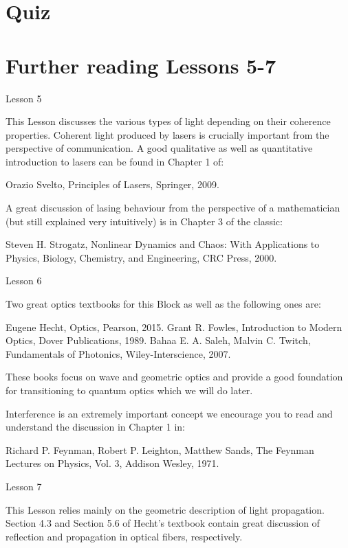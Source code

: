 \newpage
\section{Quiz}

\section{Further reading Lessons 5-7}

Lesson 5

This Lesson discusses the various types of light depending on their coherence properties. Coherent light produced by lasers is crucially important from the perspective of communication. A good qualitative as well as quantitative introduction to lasers can be found in Chapter 1 of:

Orazio Svelto, Principles of Lasers, Springer, 2009.

A great discussion of lasing behaviour from the perspective of a mathematician (but still explained very intuitively) is in Chapter 3 of the classic:

Steven H. Strogatz, Nonlinear Dynamics and Chaos: With Applications to Physics, Biology, Chemistry, and Engineering, CRC Press, 2000.

Lesson 6

Two great optics textbooks for this Block as well as the following ones are:

Eugene Hecht, Optics, Pearson, 2015.
Grant R. Fowles, Introduction to Modern Optics, Dover Publications, 1989.
Bahaa E. A. Saleh, Malvin C. Twitch, Fundamentals of Photonics, Wiley-Interscience, 2007.

These books focus on wave and geometric optics and provide a good foundation for transitioning to quantum optics which we will do later.

Interference is an extremely important concept we encourage you to read and understand the discussion in Chapter 1 in:

Richard P. Feynman, Robert P. Leighton, Matthew Sands, The Feynman Lectures on Physics, Vol. 3, Addison Wesley, 1971.

Lesson 7

This Lesson relies mainly on the geometric description of light propagation. Section 4.3 and Section 5.6 of Hecht’s textbook contain great discussion of reflection and propagation in optical fibers, respectively.
